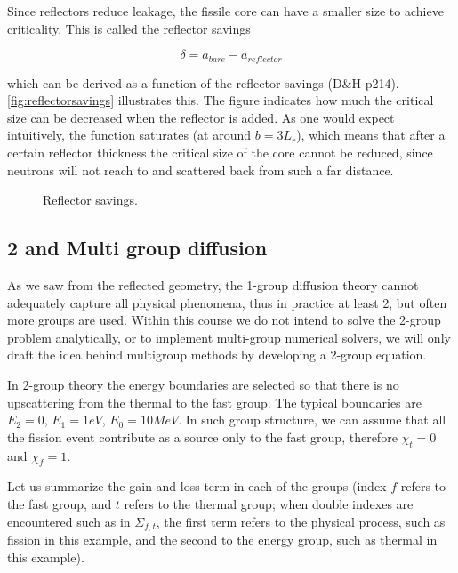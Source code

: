 Since reflectors reduce leakage, the fissile core can have a smaller size to achieve criticality. This is called the reflector savings

\begin{equation}
\delta = a_{bare}-a_{reflector}
\end{equation}

\noindent which can be derived as a function of the reflector savings (D\&H p214). \autoref{fig:reflectorsavings} illustrates this. The figure indicates how much the critical size can be decreased when the reflector is added. As one would expect intuitively, the function saturates (at around $b=3L_r$), which means that after a certain reflector thickness the critical size of the core cannot be reduced, since neutrons will not reach to and scattered back from such a far distance.

\begin{figure}[ht!]
\protect {}\protect
\caption{\label{fig:reflectorsavings} \footnotesize{Reflector savings.}}
\end{figure} 

\subsection{2 and Multi group diffusion}

As we saw from the reflected geometry, the 1-group diffusion theory cannot adequately capture all physical phenomena, thus in practice at least 2, but often more groups are used. Within this course we do not intend to solve the 2-group problem analytically, or to implement multi-group numerical solvers, we will only draft the idea behind multigroup methods by developing a 2-group equation.

In 2-group theory the energy boundaries are selected so that there is no upscattering from the thermal to the fast group. The typical boundaries are $E_2=0$, $E_1=1 eV$, $E_0=10 MeV$. In such group structure, we can assume that all the fission event contribute as a source only to the fast group, therefore $\chi_t=0$ and $\chi_f=1$.

Let us summarize the gain and loss term in each of the groups (index $f$ refers to the fast group, and $t$ refers to the thermal group; when double indexes are encountered such as in $\Sigma_{f,t}$, the first term refers to the physical process, such as fission in this example, and the second to the energy group, such as thermal in this example).


